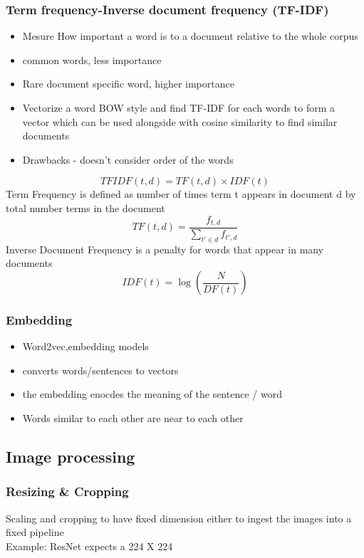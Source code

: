 \documentclass[12pt]{extarticle}
\begin{document}
\subsubsection{Term frequency-Inverse document frequency (TF-IDF)}
\begin{itemize}
    \item Mesure How important a word is to a document relative to the whole corpus
    \item common words, less importance
    \item Rare document specific word, higher importance
    \item Vectorize a word BOW style and find TF-IDF for each words to form a vector
        which can be used alongside with cosine similarity to find similar documents
    \item Drawbacks - doesn't consider order of the words
\end{itemize}
$$
TFIDF(t, d) = TF(t,d) \times IDF(t)
$$
Term Frequency is defined as number of times term t appears in document d by 
total number terms in the document
$$
TF(t, d) = \frac{f_{t,d}}{\sum_{t' \in d} f_{t',d}}
$$
Inverse Document Frequency is a penalty for words that appear in many documents
$$
IDF(t) = \log \left( \frac{N}{DF(t)} \right)
$$

\subsubsection{Embedding}
\begin{itemize}
    \item Word2vec,embedding models
    \item converts words/sentences to vectors
    \item the embedding enocdes the meaning of the sentence / word
    \item Words similar to each other are near to each other
\end{itemize}


\subsection{Image processing}
\subsubsection{Resizing \& Cropping}
Scaling and cropping to have fixed dimension either to ingest the images into 
a fixed pipeline \\
Example: ResNet expects a 224 X 224 
\end{document}
